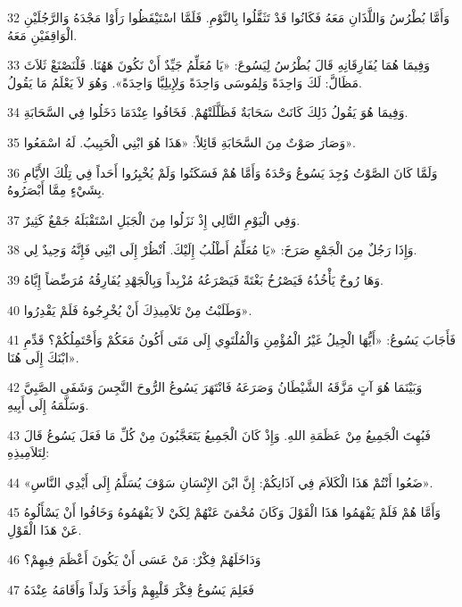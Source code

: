 \par 32 وَأَمَّا بُطْرُسُ وَاللَّذَانِ مَعَهُ فَكَانُوا قَدْ تَثَقَّلُوا بِالنَّوْمِ. فَلَمَّا اسْتَيْقَظُوا رَأَوْا مَجْدَهُ وَالرَّجُلَيْنِ الْوَاقِفَيْنِ مَعَهُ.
\par 33 وَفِيمَا هُمَا يُفَارِقَانِهِ قَالَ بُطْرُسُ لِيَسُوعَ: «يَا مُعَلِّمُ جَيِّدٌ أَنْ نَكُونَ هَهُنَا. فَلْنَصْنَعْ ثَلاَثَ مَظَالَّ: لَكَ وَاحِدَةً وَلِمُوسَى وَاحِدَةً وَلِإِيلِيَّا وَاحِدَةً». وَهُوَ لاَ يَعْلَمُ مَا يَقُولُ.
\par 34 وَفِيمَا هُوَ يَقُولُ ذَلِكَ كَانَتْ سَحَابَةٌ فَظَلَّلَتْهُمْ. فَخَافُوا عِنْدَمَا دَخَلُوا فِي السَّحَابَةِ.
\par 35 وَصَارَ صَوْتٌ مِنَ السَّحَابَةِ قَائِلاً: «هَذَا هُوَ ابْنِي الْحَبِيبُ. لَهُ اسْمَعُوا».
\par 36 وَلَمَّا كَانَ الصَّوْتُ وُجِدَ يَسُوعُ وَحْدَهُ وَأَمَّا هُمْ فَسَكَتُوا وَلَمْ يُخْبِرُوا أَحَداً فِي تِلْكَ الأَيَّامِ بِشَيْءٍ مِمَّا أَبْصَرُوهُ.
\par 37 وَفِي الْيَوْمِ التَّالِي إِذْ نَزَلُوا مِنَ الْجَبَلِ اسْتَقْبَلَهُ جَمْعٌ كَثِيرٌ.
\par 38 وَإِذَا رَجُلٌ مِنَ الْجَمْعِ صَرَخَ: «يَا مُعَلِّمُ أَطْلُبُ إِلَيْكَ. اُنْظُرْ إِلَى ابْنِي فَإِنَّهُ وَحِيدٌ لِي.
\par 39 وَهَا رُوحٌ يَأْخُذُهُ فَيَصْرُخُ بَغْتَةً فَيَصْرَعُهُ مُزْبِداً وَبِالْجَهْدِ يُفَارِقُهُ مُرَضِّضاً إِيَّاهُ.
\par 40 وَطَلَبْتُ مِنْ تَلاَمِيذِكَ أَنْ يُخْرِجُوهُ فَلَمْ يَقْدِرُوا».
\par 41 فَأَجَابَ يَسُوعُ: «أَيُّهَا الْجِيلُ غَيْرُ الْمُؤْمِنِ وَالْمُلْتَوِي إِلَى مَتَى أَكُونُ مَعَكُمْ وَأَحْتَمِلُكُمْ؟ قَدِّمِ ابْنَكَ إِلَى هُنَا».
\par 42 وَبَيْنَمَا هُوَ آتٍ مَزَّقَهُ الشَّيْطَانُ وَصَرَعَهُ فَانْتَهَرَ يَسُوعُ الرُّوحَ النَّجِسَ وَشَفَى الصَّبِيَّ وَسَلَّمَهُ إِلَى أَبِيهِ.
\par 43 فَبُهِتَ الْجَمِيعُ مِنْ عَظَمَةِ اللهِ. وَإِذْ كَانَ الْجَمِيعُ يَتَعَجَّبُونَ مِنْ كُلِّ مَا فَعَلَ يَسُوعُ قَالَ لِتَلاَمِيذِهِ:
\par 44 «ضَعُوا أَنْتُمْ هَذَا الْكَلاَمَ فِي آذَانِكُمْ: إِنَّ ابْنَ الإِنْسَانِ سَوْفَ يُسَلَّمُ إِلَى أَيْدِي النَّاسِ».
\par 45 وَأَمَّا هُمْ فَلَمْ يَفْهَمُوا هَذَا الْقَوْلَ وَكَانَ مُخْفىً عَنْهُمْ لِكَيْ لاَ يَفْهَمُوهُ وَخَافُوا أَنْ يَسْأَلُوهُ عَنْ هَذَا الْقَوْلِ.
\par 46 وَدَاخَلَهُمْ فِكْرٌ: مَنْ عَسَى أَنْ يَكُونَ أَعْظَمَ فِيهِمْ؟
\par 47 فَعَلِمَ يَسُوعُ فِكْرَ قَلْبِهِمْ وَأَخَذَ وَلَداً وَأَقَامَهُ عِنْدَهُ
